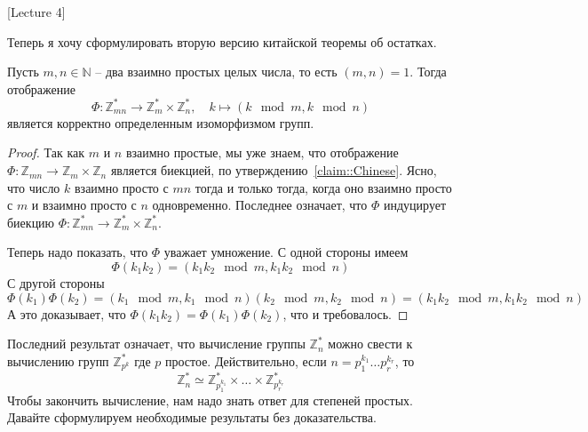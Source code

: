 [Lecture 4]


Теперь я хочу сформулировать вторую версию китайской теоремы об остатках.

\begin{claim}
\label{claim::ChineseMult}
Пусть $m, n\in \mathbb N$ -- два взаимно простых целых числа, то есть $(m,n) = 1$. Тогда отображение
\[
\Phi \colon \mathbb Z_{mn}^* \to \mathbb Z_m^* \times \mathbb Z_n^*,\quad k\mapsto (k\!\!\mod m, k\!\!\mod n)
\]
является корректно определенным изоморфизмом групп.
\end{claim}
\begin{proof}
Так как $m$ и $n$ взаимно простые, мы уже знаем, что отображение $\Phi\colon\mathbb Z_{mn}\to \mathbb Z_m \times \mathbb Z_n$ является биекцией, по утверждению~\ref{claim::Chinese}. Ясно, что число $k$ взаимно просто с $mn$ тогда и только тогда, когда оно взаимно просто с $m$ и взаимно просто с $n$ одновременно. Последнее означает, что $\Phi$ индуцирует биекцию $\Phi\colon\mathbb Z_{mn}^*\to \mathbb Z_m^* \times \mathbb Z_n^*$.

Теперь надо показать, что $\Phi$ уважает умножение.
С одной стороны имеем
\[
\Phi(k_1k_2)  = (k_1k_2\!\!\mod m, k_1k_2\!\!\mod n)
\]
С другой стороны
\[
\Phi(k_1)\Phi(k_2) = (k_1\!\!\mod m, k_1\!\!\mod n)(k_2\!\!\mod m, k_2\!\!\mod n) = (k_1k_2\!\!\mod m, k_1k_2\!\!\mod n)
\]
А это доказывает, что $\Phi(k_1k_2) = \Phi(k_1)\Phi(k_2)$, что и требовалось.
\end{proof}

Последний результат означает, что вычисление группы $\mathbb Z_n^*$ можно свести к вычислению групп $\mathbb Z_{p^k}^*$ где $p$ простое. Действительно, если $n = p_1^{k_1}\ldots p_r^{k_r}$, то
\[
\mathbb Z_n^* \simeq \mathbb Z_{p_1^{k_1}}^*\times\ldots \times \mathbb Z_{p_r^{k_r}}^*
\]
Чтобы закончить вычисление, нам надо знать ответ для степеней простых. Давайте сформулируем необходимые результаты без доказательства.

